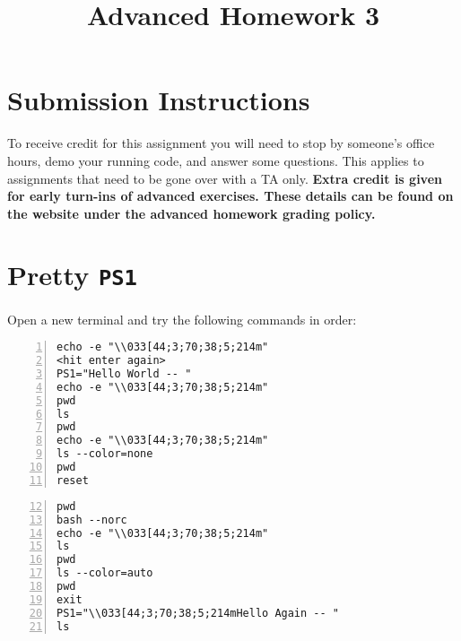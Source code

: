 \documentclass{article}
\begin{document}
\fancyfoot[C]{\color{gray} \thepage~/~\pageref*{LastPage}}
\pagestyle{fancyplain}

\title{\textbf{Advanced Homework 3\\}}
\author{\textbf{\color{red}{Due: Wednesday, October 2nd, 11:59PM (Hard Deadline)}}}
\date{}
\maketitle


\section*{Submission Instructions}
To receive credit for this assignment you will need to stop by someone's
office hours, demo your running code, and answer some questions. \textbf{\color{red}{Make sure
to check the office hour schedule as the real due date is at the last office
hours before the date listed above.}} This applies to assignments that need to be gone over with a TA only.
\textbf{Extra credit is given for early turn-ins of advanced exercises. These details can be found on the website under the advanced homework grading policy.}


\section{Pretty \texttt{PS1}}

Open a new terminal and try the following commands in order:

\begin{minipage}[t]{0.5\textwidth}
\begin{lstlisting}[numbers=left]
echo -e "\\033[44;3;70;38;5;214m"
<hit enter again>
PS1="Hello World -- "
echo -e "\\033[44;3;70;38;5;214m"
pwd
ls
pwd
echo -e "\\033[44;3;70;38;5;214m"
ls --color=none
pwd
reset
\end{lstlisting}
\end{minipage}
\begin{minipage}[t]{0.5\textwidth}
  \begin{lstlisting}[numbers=left,firstnumber=12]
pwd
bash --norc
echo -e "\\033[44;3;70;38;5;214m"
ls
pwd
ls --color=auto
pwd
exit
PS1="\\033[44;3;70;38;5;214mHello Again -- "
ls
\end{lstlisting}
\end{minipage}
\end{document}
